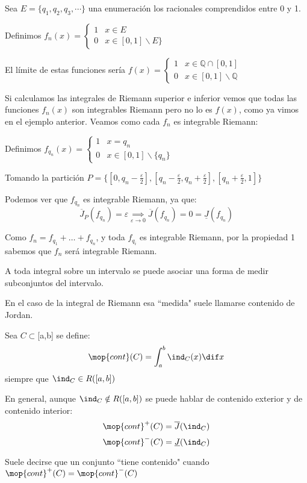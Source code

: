 \documentclass{apuntes}
\begin{document}
\begin{example} $ $

Sea $E = \lbrace q_1, q_2, q_3, \cdots \rbrace$ una enumeración los racionales comprendidos entre 0 y 1.

Definimos $f_n(x)=
\begin{cases}
   1 &  x \in E \\
   0       &  x \in [0,1] \backslash E \rbrace
\end{cases}$

El límite de estas funciones sería $f(x)=
\begin{cases}
   1 &  x \in \mathbb{Q} \cap [0,1] \\
   0       &  x \in [0,1] \backslash \mathbb{Q}
\end{cases}$

Si calculamos las integrales de Riemann superior e inferior vemos que todas las funciones $f_n(x)$ son integrables Riemann pero no lo es $f(x)$, como ya vimos en el ejemplo anterior.
 Veamos como cada $f_n$ es integrable Riemann:


Definimos $f_{q_n}(x) =
\begin{cases}
	1 & x = q_n\\
	0 & x \in [0,1] \backslash \{q_n\}
\end{cases}$

Tomando la partición
$P = \{ [0, q_n - \frac{\varepsilon}{2}], [q_n - \frac{\varepsilon}{2}, q_n + \frac{\varepsilon}{2}], [q_n + \frac{\varepsilon}{2}, 1] \}$


Podemos ver que $f_{q_n}$ es integrable Riemann, ya que:
\[ \overline{J}_P (f_{q_n}) =
\varepsilon \underset{\varepsilon \rightarrow 0}{\implies} \overline{J} (f_{q_n}) = 0 = \underline{J} (f_{q_n}) \]

Como $f_n = f_{q_1} + \ldots + f_{q_n}$, y toda $ f_{q_i}$ es integrable Riemann, por la propiedad 1 sabemos que $f_n$ será integrable Riemann.
\end{example}

\begin{defn}[Contenido]
A toda integral sobre un intervalo se puede asociar una forma de medir subconjuntos del intervalo.

En el caso de la integral de Riemann esa ``medida" suele llamarse contenido de Jordan.

Sea $C\subset$[a,b] se define:
\[\mop{cont}(C) = \int_a^b \ind_{C}(x) \dif x\]
siempre que $\ind_C \in R([a,b])$

En general, aunque $\ind_C \notin R([a,b])$ se puede hablar de contenido exterior y de contenido interior:
\[\mop{cont}^+(C)=\overline{J}(\ind_C)\]
\[\mop{cont}^-(C)=\underline{J}(\ind_C)\]

Suele decirse que un conjunto ``tiene contenido" cuando $\mop{cont}^+(C)=\mop{cont}^-(C)$
\end{defn}
\end{document}
